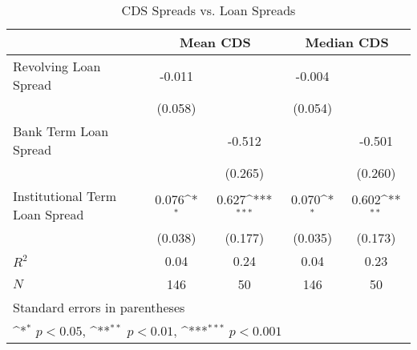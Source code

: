 \begin{table}[htbp]\centering
\def\sym#1{\ifmmode^{#1}\else\(^{#1}\)\fi}
\caption{CDS Spreads vs. Loan Spreads}
\begin{tabular}{l*{4}{c}}
\hline\hline
                    &\multicolumn{2}{c}{Mean CDS}               &\multicolumn{2}{c}{Median CDS}             \\\cmidrule(lr){2-3}\cmidrule(lr){4-5}
\hline
Revolving Loan Spread&      -0.011         &                     &      -0.004         &                     \\
                    &     (0.058)         &                     &     (0.054)         &                     \\
[1em]
Bank Term Loan Spread&                     &      -0.512         &                     &      -0.501         \\
                    &                     &     (0.265)         &                     &     (0.260)         \\
[1em]
Institutional Term Loan Spread&       0.076\sym{*}  &       0.627\sym{***}&       0.070\sym{*}  &       0.602\sym{**} \\
                    &     (0.038)         &     (0.177)         &     (0.035)         &     (0.173)         \\
\hline
$ R^2$              &        0.04         &        0.24         &        0.04         &        0.23         \\
$ N $               &         146         &          50         &         146         &          50         \\
\hline\hline
\multicolumn{5}{l}{\footnotesize Standard errors in parentheses}\\
\multicolumn{5}{l}{\footnotesize \sym{*} \(p<0.05\), \sym{**} \(p<0.01\), \sym{***} \(p<0.001\)}\\
\end{tabular}
\end{table}
